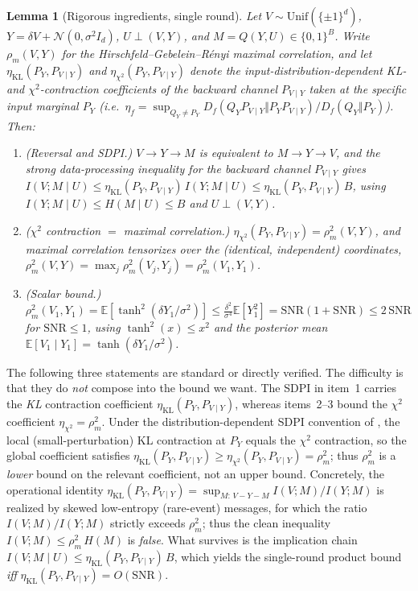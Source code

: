 \documentclass[11pt]{article}
\newtheorem{lemma}{Lemma}
\theoremstyle{definition}
\newcommand{\E}{\mathbb{E}}
\newcommand{\Unif}{\mathrm{Unif}}
\newcommand{\Ncal}{\mathcal{N}}
\begin{document}
\begin{lemma}[Rigorous ingredients, single round]
\label{lem:singleround}
Let $V\sim\Unif(\{\pm1\}^d)$, $Y=\delta V+\Ncal(0,\sigma^2 I_d)$, $U\perp(V,Y)$, and $M=Q(Y,U)\in\{0,1\}^B$.
Write $\rho_m(V,Y)$ for the Hirschfeld--Gebelein--R\'enyi maximal correlation, and let
$\eta_{\mathrm{KL}}(P_Y,P_{V\mid Y})$ and $\eta_{\chi^2}(P_Y,P_{V\mid Y})$ denote the input-distribution-dependent
KL- and $\chi^2$-contraction coefficients of the backward channel $P_{V\mid Y}$ taken at the specific
input marginal $P_Y$ (i.e.\ $\eta_f=\sup_{Q_Y\neq P_Y}D_f(Q_YP_{V\mid Y}\Vert P_YP_{V\mid Y})/D_f(Q_Y\Vert P_Y)$).
Then:
\begin{enumerate}[leftmargin=1.6em,itemsep=2pt]
  \item \emph{(Reversal and SDPI.)} $V\to Y\to M$ is equivalent to $M\to Y\to V$, and the strong
  data-processing inequality \citep{polyanskiy2017sdpi} for the backward channel $P_{V\mid Y}$ gives
  $I(V;M\mid U)\le\eta_{\mathrm{KL}}(P_Y,P_{V\mid Y})\,I(Y;M\mid U)\le\eta_{\mathrm{KL}}(P_Y,P_{V\mid Y})\,B$,
  using $I(Y;M\mid U)\le H(M\mid U)\le B$ and $U\perp(V,Y)$.
  \item \emph{($\chi^2$ contraction $=$ maximal correlation.)} $\eta_{\chi^2}(P_Y,P_{V\mid Y})=\rho_m^2(V,Y)$,
  and maximal correlation tensorizes over the (identical, independent) coordinates,
  $\rho_m^2(V,Y)=\max_j\rho_m^2(V_j,Y_j)=\rho_m^2(V_1,Y_1)$.
  \item \emph{(Scalar bound.)} $\rho_m^2(V_1,Y_1)=\E[\tanh^2(\delta Y_1/\sigma^2)]\le\frac{\delta^2}{\sigma^4}\E[Y_1^2]
  =\mathrm{SNR}(1+\mathrm{SNR})\le2\,\mathrm{SNR}$ for $\mathrm{SNR}\le1$, using $\tanh^2(x)\le x^2$ and the
  posterior mean $\E[V_1\mid Y_1]=\tanh(\delta Y_1/\sigma^2)$.
\end{enumerate}
\end{lemma}

The following three statements are standard or directly verified. The difficulty is that they do
\emph{not} compose into the bound we want. The SDPI in item~1 carries the \emph{KL} contraction
coefficient $\eta_{\mathrm{KL}}(P_Y,P_{V\mid Y})$, whereas items~2--3 bound the \emph{$\chi^2$} coefficient
$\eta_{\chi^2}=\rho_m^2$. Under the distribution-dependent SDPI convention of
\citet{polyanskiy2017sdpi}, the local (small-perturbation) KL contraction at $P_Y$ equals the $\chi^2$
contraction, so the global coefficient satisfies $\eta_{\mathrm{KL}}(P_Y,P_{V\mid Y})\ge\eta_{\chi^2}(P_Y,P_{V\mid Y})=\rho_m^2$;
thus $\rho_m^2$ is a \emph{lower} bound on the relevant coefficient, not an upper bound. Concretely, the
operational identity $\eta_{\mathrm{KL}}(P_Y,P_{V\mid Y})=\sup_{M:\,V-Y-M} I(V;M)/I(Y;M)$ is realized by
skewed low-entropy (rare-event) messages, for which the ratio $I(V;M)/I(Y;M)$ strictly exceeds
$\rho_m^2$; thus the clean inequality $I(V;M)\le\rho_m^2\,H(M)$ is \emph{false}. What survives is the
implication chain $I(V;M\mid U)\le\eta_{\mathrm{KL}}(P_Y,P_{V\mid Y})\,B$, which yields the single-round
product bound \emph{iff} $\eta_{\mathrm{KL}}(P_Y,P_{V\mid Y})=O(\mathrm{SNR})$.
\end{document}
